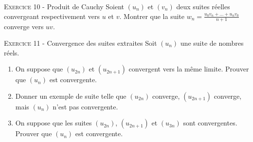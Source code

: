 \documentclass[11pt]{article}
\begin{document}


\vskip0.3cm\noindent\textsc{Exercice 10} - Produit de Cauchy
\vskip0.2cm
Soient $(u_n)$ et $(v_n)$ deux suites réelles convergeant respectivement vers $u$ et $v$.
Montrer que la suite $\displaystyle w_n=\frac{u_0v_n+\dots+u_nv_0}{n+1}$ converge vers $uv$.




\vskip0.3cm\noindent\textsc{Exercice 11} - Convergence des suites extraites
\vskip0.2cm
Soit $(u_n)$ une suite de nombres réels.
\begin{enumerate}
\item On suppose que $(u_{2n})$ et $(u_{2n+1})$ convergent vers la même limite. Prouver que $(u_n)$ est convergente.
\item Donner un exemple de suite telle que $(u_{2n})$ converge, $(u_{2n+1})$ converge, mais $(u_{n})$ n'est pas convergente.
\item On suppose que les suites $(u_{2n})$, $(u_{2n+1})$ et $(u_{3n})$ sont convergentes. Prouver que $(u_n)$ est convergente.
\end{enumerate}




\vskip0.5cm

\end{document}
